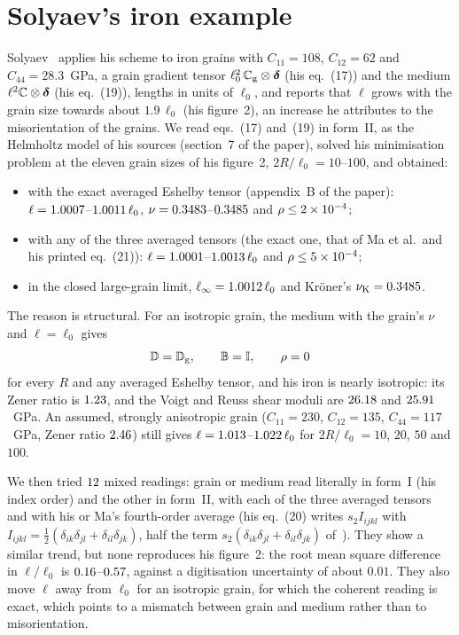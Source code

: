 \section{Solyaev's iron example}\label{sup:fe}

Solyaev~\cite[section~5]{Solyaev2023} applies his scheme to iron grains with
$C_{11}=108$, $C_{12}=62$ and $C_{44}=28.3$~GPa, a grain gradient tensor
$\ell_0^2\,\mathbb{C}_{\mathrm{g}}\otimes\bm{\delta}$ (his eq.~(17)) and the medium $\ell^2\mathbb{C}\otimes\bm{\delta}$ (his
eq.~(19)), lengths in units of $\ell_0$, and reports that $\ell$ grows with the grain size
towards about $1.9\,\ell_0$ (his figure~2), an increase he attributes to the misorientation of
the grains. We read eqs.~(17) and~(19) in form~II, as the Helmholtz model of his sources
(section~7 of the paper), solved his minimisation problem at the eleven grain sizes of his
figure~2, $2R/\ell_0=10$--$100$, and obtained:
\begin{itemize}
\item with the exact averaged Eshelby tensor (appendix~B of the paper):
$\ell=1.0007$--$1.0011\,\ell_0$,
$\nu=0.3483$--$0.3485$ and $\rho\le2\times10^{-4}$;
\item with any of the three averaged tensors (the exact one, that of Ma et al.\ and his
printed eq.~(21)): $\ell=1.0001$--$1.0013\,\ell_0$ and
$\rho\le5\times10^{-4}$;
\item in the closed large-grain limit, $\ell_{\infty}=1.0012\,\ell_0$ and Kr\"oner's
$\nu_{\mathrm K}=0.3485$.
\end{itemize}
The reason is structural. For an isotropic grain, the medium with the grain's $\nu$ and
$\ell=\ell_0$ gives
\begin{equation}
\mathbb{D}=\mathbb{D}_{\mathrm{g}},\qquad \mathbb{B}=\mathbb{I},\qquad \rho=0
\end{equation}
for every $R$ and any averaged Eshelby tensor, and his iron is nearly isotropic: its Zener
ratio is $1.23$, and the Voigt and Reuss shear moduli are $26.18$ and
$25.91$~GPa. An assumed, strongly anisotropic grain ($C_{11}=230$, $C_{12}=135$,
$C_{44}=117$~GPa, Zener ratio $2.46$) still gives
$\ell=1.013$--$1.022\,\ell_0$ for $2R/\ell_0=10$, $20$, $50$ and
$100$.

We then tried $12$ mixed readings: grain or medium read literally in form~I
(his index order) and the other in form~II, with each of the three averaged tensors and with
his or Ma's fourth-order average (his eq.~(20) writes $s_2I_{ijkl}$ with
$I_{ijkl}=\tfrac12(\delta_{ik}\delta_{jl}+\delta_{il}\delta_{jk})$, half the term
$s_2(\delta_{ik}\delta_{jl}+\delta_{il}\delta_{jk})$ of~\cite[eq.~(3.18)]{Ma2018}). They show a
similar trend, but none reproduces his figure~2: the root mean square difference in
$\ell/\ell_0$ is $0.16$--$0.57$, against a digitisation uncertainty
of about $0.01$. They also move $\ell$ away from $\ell_0$ for an isotropic grain, for which the
coherent reading is exact, which points to a mismatch between grain and medium rather than to
misorientation.

